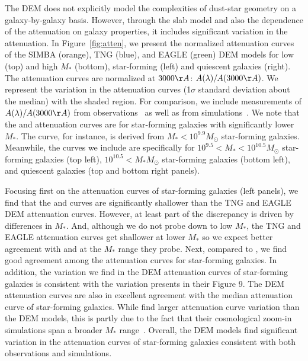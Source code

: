 
The DEM does not explicitly model the complexities of dust-star geometry on a
galaxy-by-galaxy basis. However, through the slab model and also the dependence of
the attenuation on galaxy properties, it includes significant variation in the
attenuation. In Figure~\ref{fig:atten}, we present the normalized attenuation 
curves of the SIMBA (orange), TNG (blue), and EAGLE (green) DEM models for low 
(top) and high $M_*$ (bottom), star-forming (left) and quiescent galaxies (right).
The attenuation curves are normalized at $3000\AA$: $A(\lambda)/A(3000\AA)$.
We represent the variation in the attenuation curves (1$\sigma$ standard
deviation about the median) with the shaded region. For comparison, we include measurements 
of $A(\lambda)/A(3000\AA)$ from observations~\citep{caleztti2000, battisti2017, salim2018} 
as well as from simulations~\cite{narayanan2018}. We note that the \cite{calzetti2000} and
\cite{battisti2017} attenuation curves are for star-forming galaxies with
significantly lower $M_*$. The \cite{battisti2017} curve, for instance, is
derived from $M_* < 10^{9.9}M_\odot$ star-forming galaxies. Meanwhile, the
\cite{salim2018} curves we include are specifically for $10^{9.5} < M_* < 10^{10.5}M_\odot$ 
star-forming galaxies (top left), $10^{10.5} < M_*M_\odot$ star-forming
galaxies (bottom left), and quiescent galaxies (top and bottom right panels). 


Focusing first on the attenuation curves of star-forming galaxies (left
panels), we find that the \cite{calzetti2000} and \cite{battisit2017} curves
are significantly shallower than the TNG and EAGLE DEM attenuation curves.
However, at least part of the discrepancy is driven by differences in $M_*$.
And, although we do not probe down to low $M_*$, the TNG and EAGLE attenuation 
curves get shallower at lower $M_*$ so we expect better agreement with 
\cite{calzetti2000} and \cite{battisit2017} at the $M_*$ range they probe. 
Next, compared to \cite{salim2018}, we find good agreement among the attenuation
curves for star-forming galaxies. In addition, the variation we find in the
DEM attenuation curves of star-forming galaxies is consistent with the
variation \cite{salim2018} presents in their Figure 9. The DEM attenuation
curves are also in excellent agreement with the median attenuation curve of
\cite{narayanan2018} star-forming galaxies. While \cite{narayanan2018} find
larger attenuation curve variation than the DEM models, this is partly due to
the fact that their cosmological zoom-in simulations span a broader $M_*$ 
range~\citep{abruzzo2018}. Overall, the DEM models find significant variation 
in the attenuation curves of star-forming galaxies consistent with both observations and
simulations. 

